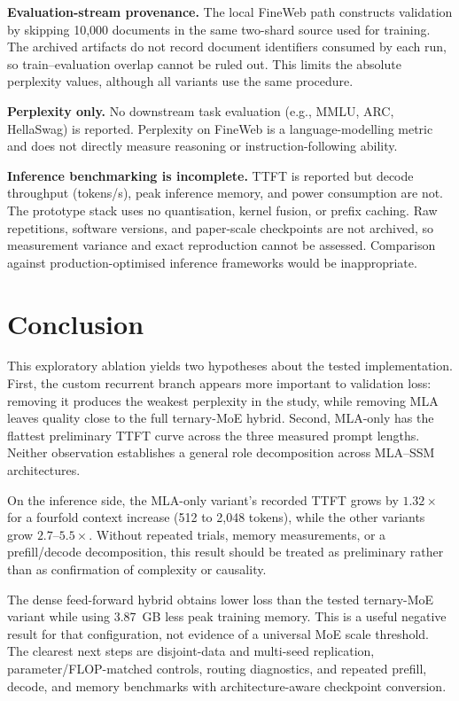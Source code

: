 \documentclass[conference]{IEEEtran}
\begin{document}
\textbf{Evaluation-stream provenance.} The local FineWeb path constructs
validation by skipping 10{,}000 documents in the same two-shard source used for
training. The archived artifacts do not record document identifiers consumed
by each run, so train--evaluation overlap cannot be ruled out. This limits the
absolute perplexity values, although all variants use the same procedure.

\textbf{Perplexity only.} No downstream task evaluation (e.g., MMLU, ARC,
HellaSwag) is reported. Perplexity on FineWeb is a language-modelling metric
and does not directly measure reasoning or instruction-following ability.

\textbf{Inference benchmarking is incomplete.} TTFT is reported but decode
throughput (tokens/s), peak inference memory, and power consumption are not.
The prototype stack uses no quantisation, kernel fusion, or prefix caching.
Raw repetitions, software versions, and paper-scale checkpoints are not
archived, so measurement variance and exact reproduction cannot be assessed.
Comparison against production-optimised inference frameworks would be inappropriate.


\section{Conclusion}

This exploratory ablation yields two hypotheses about the tested implementation.
First, the custom recurrent branch appears more important to validation loss:
removing it produces the weakest perplexity in the study, while removing MLA
leaves quality close to the full ternary-MoE hybrid. Second, MLA-only has the
flattest preliminary TTFT curve across the three measured prompt lengths.
Neither observation establishes a general role decomposition across MLA--SSM
architectures.

On the inference side, the MLA-only variant's recorded TTFT grows by
$1.32\times$ for a fourfold context increase (512 to 2{,}048 tokens), while the
other variants grow $2.7$--$5.5\times$. Without repeated trials, memory
measurements, or a prefill/decode decomposition, this result should be treated
as preliminary rather than as confirmation of complexity or causality.

The dense feed-forward hybrid obtains lower loss than the tested ternary-MoE
variant while using 3.87~GB less peak training memory. This is a useful negative
result for that configuration, not evidence of a universal MoE scale threshold.
The clearest next steps are disjoint-data and multi-seed replication,
parameter/FLOP-matched controls, routing diagnostics, and repeated prefill,
decode, and memory benchmarks with architecture-aware checkpoint conversion.
\end{document}
